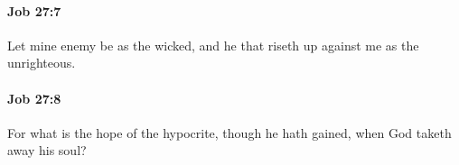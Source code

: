 		\paragraph{Job 27:7} %
			\label{JOB-27-7}

			Let mine enemy be as the wicked, and he that riseth up against me as the unrighteous.


		\paragraph{Job 27:8} %
			\label{JOB-27-8}

			For what is the hope of the hypocrite, though he hath gained, when God taketh away his soul?


